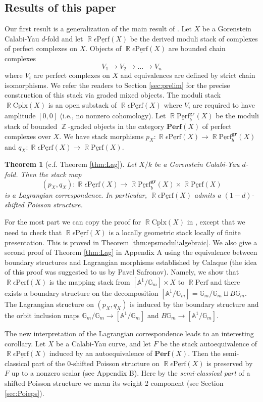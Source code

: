 \documentclass[reqno]{amsart}
\DeclareMathOperator\Z{\mathbb Z}
\DeclareMathOperator\R{\mathbb R}
\newtheorem{theorem}{Theorem}[section]
\theoremstyle{definition}
\theoremstyle{remark}
\newcommand{\G}{{\mathbb G}}
\newcommand{\A}{{\mathbb A}}
\newcommand{\ul}{\underline}
\newcommand{\eps}{\epsilon}
\newcommand{\cplx}{{\mathrm{Cplx}}}
\newcommand{\perf}{\mathbf{Perf}}
\newcommand{\uperf}{\ul{\mathrm{Perf}}}
\newcommand{\gr}{\mathbf{gr}}
\numberwithin{equation}{section}
\begin{document}
\subsection{Results of this paper}
Our first result is a generalization of the main result of \cite{HP1}. Let $X$ be a Gorenstein Calabi-Yau $d$-fold and let $\R\eps\uperf(X)$ be the derived moduli stack of complexes of perfect complexes on $X$. Objects of $\R\eps\uperf(X)$  are bounded chain complexes
\[
V_1\to V_2\to\ldots \to V_n
\] where $V_i$ are perfect complexes on $X$ and equivalences are defined by strict chain isomorphisms. We refer the readers to Section \ref{sec:prelim} for the precise construction of this stack via graded mixed objects. The moduli stack $\R\ul\cplx(X)$ is an open substack of $\R\eps\uperf(X)$ where $V_i$ are required to have amplitude $[0,0]$ (i.e., no nonzero cohomology). Let $\R\uperf^\gr_b(X)$ be the moduli stack of bounded $\Z$-graded objects in the category $\perf(X)$ of perfect complexes over $X$. We have stack morphisms $p_X: \R\eps\uperf(X)\to \R\uperf^\gr_b(X)$ and $q_X: \R\eps\uperf(X)\to \R\uperf(X)$.
\begin{theorem}[c.f. Theorem \ref{thm:Lag}]
Let $X/k$ be a Gorenstein Calabi-Yau $d$-fold. Then the stack map
\[
(p_X,q_X): \R\eps\uperf(X)\to \R\uperf^\gr_b(X)\times\R\uperf(X)
\]  is a Lagrangian correspondence. In particular, $\R\eps\uperf(X)$ admits a $(1-d)$-shifted Poisson structure.
\end{theorem}

For the most part we can copy the proof for $\R\ul\cplx(X)$ in \cite{HP1}, except that we need to check that $\R\eps\uperf(X)$ is a locally geometric stack locally of finite presentation. 
This is proved in Theorem \ref{thm:epsmodulialgebraic}. We also give a second proof of Theorem \ref{thm:Lag} in Appendix A using the equivalence between boundary structures and Lagrangian morphisms established by Calaque \cite{Ca14} (the idea of this proof was suggested to us by Pavel Safronov). 
Namely, we show that $\R\eps\uperf(X)$ is the mapping stack from $[\A^1\big/\G_m]\times X$ to $\R\uperf$ and there exists a boundary structure on the decomposition $[\A^1\big/\G_m]=\G_m\big/\G_m\sqcup B\G_m$. The Lagrangian structure on $(p_X,q_X)$ is induced by the boundary structure and the orbit inclusion maps $\G_m\big/\G_m\to [\A^1\big/\G_m]$  and $B\G_m\to [\A^1\big/\G_m]$. 

The new interpretation of the Lagrangian correspondence leads to an interesting corollary. Let $X$ be a Calabi-Yau curve, and let $F$ be the stack autoequivalence of $\R\eps\uperf(X)$ induced by an autoequivalence of $\perf(X)$. Then the semi-classical part of the 0-shifted Poisson structure on $\R\eps\uperf(X)$ is preserved by $F$ up to a nonzero scalar (see Appendix B). Here by the {\it semi-classical part} of a shifted Poisson structure we mean its weight 2 component (see Section \ref{sec:Poieps}).
\end{document}
